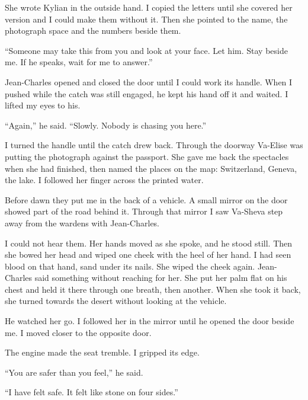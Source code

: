 She wrote Kylian in the outside hand. I copied the letters until she covered her version and I could make them without it. Then she pointed to the name, the photograph space and the numbers beside them.\par

``Someone may take this from you and look at your face. Let him. Stay beside me. If he speaks, wait for me to answer.''\par

Jean-Charles opened and closed the door until I could work its handle. When I pushed while the catch was still engaged, he kept his hand off it and waited. I lifted my eyes to his.\par

``Again,'' he said. ``Slowly. Nobody is chasing you here.''\par

I turned the handle until the catch drew back. Through the doorway Va-Elise was putting the photograph against the passport. She gave me back the spectacles when she had finished, then named the places on the map: Switzerland, Geneva, the lake. I followed her finger across the printed water.\par

Before dawn they put me in the back of a vehicle. A small mirror on the door showed part of the road behind it. Through that mirror I saw Va-Sheva step away from the wardens with Jean-Charles.\par

I could not hear them. Her hands moved as she spoke, and he stood still. Then she bowed her head and wiped one cheek with the heel of her hand. I had seen blood on that hand, sand under its nails. She wiped the cheek again. Jean-Charles said something without reaching for her. She put her palm flat on his chest and held it there through one breath, then another. When she took it back, she turned towards the desert without looking at the vehicle.\par

He watched her go. I followed her in the mirror until he opened the door beside me. I moved closer to the opposite door.\par

The engine made the seat tremble. I gripped its edge.\par

``You are safer than you feel,'' he said.\par

``I have felt safe. It felt like stone on four sides.''\par

